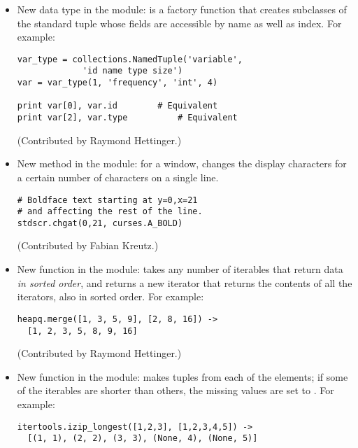 \documentclass{howto}
\begin{document}
\begin{itemize}

\item New data type in the  module:
 is a factory function that
creates subclasses of the standard tuple whose fields are accessible
by name as well as index.  For example:

\begin{verbatim}
var_type = collections.NamedTuple('variable', 
             'id name type size')
var = var_type(1, 'frequency', 'int', 4)

print var[0], var.id		# Equivalent
print var[2], var.type          # Equivalent
\end{verbatim}

(Contributed by Raymond Hettinger.)

\item New method in the  module:
for a window,  changes the display characters for a 
certain number of characters on a single line.

\begin{verbatim}
# Boldface text starting at y=0,x=21 
# and affecting the rest of the line.
stdscr.chgat(0,21, curses.A_BOLD)  
\end{verbatim}

(Contributed by Fabian Kreutz.)

\item New function in the  module:
takes any number of iterables that return data 
\emph{in sorted order}, 
and 
returns a new iterator that returns the contents of
all the iterators, also in sorted order.  For example:

\begin{verbatim}
heapq.merge([1, 3, 5, 9], [2, 8, 16]) ->
  [1, 2, 3, 5, 8, 9, 16]
\end{verbatim}

(Contributed by Raymond Hettinger.)

\item New function in the  module:
makes tuples from each of the elements; if some of the iterables
are shorter than others, the missing values 
are set to .  For example:

\begin{verbatim}
itertools.izip_longest([1,2,3], [1,2,3,4,5]) ->
  [(1, 1), (2, 2), (3, 3), (None, 4), (None, 5)]
\end{verbatim}


\end{itemize}
\end{document}
